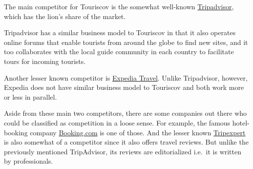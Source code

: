 \documentclass[12pt]{article}
\begin{document}
\begin{minipage}{.5\textwidth}
The main competitor for Touriscov is the somewhat well-known \href{https://www.tripadvisor.com/}{Tripadvisor}, which has the lion's share of the market.\ \par

Tripadvisor has a similar business model to Touriscov in that it also operates online forums that enable tourists from around the globe to find new sites, and it too collaborates with the local guide community in each country to facilitate tours for incoming tourists.\ \par

Another lesser known competitor is \href{https://www.expedia.com/}{Expedia Travel}. Unlike Tripadvisor, however, Expedia does not have similar business model to Touriscov and both work more or less in parallel.\ \par

Aside from these main two competitors, there are some companies out there who could be classified as competition in a loose sense. For example, the famous hotel-booking company \href{https://www.booking.com/}{Booking.com} is one of those. And the lesser known \href{https://www.tripexpert.com/}{Tripexpert} is also somewhat of a competitor since it also offers travel reviews. But unlike the previously mentioned TripAdvisor, its reviews are editorialized i.e.\ it is written by professionals.

\end{minipage}%
\hfill
\end{document}
